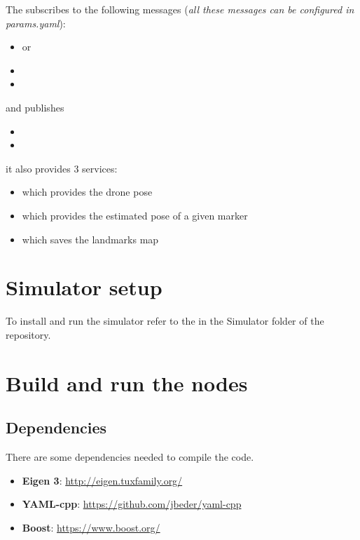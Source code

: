 The  subscribes to the following messages (\emph{all these messages can be configured in params.yaml}):
\begin{itemize}
    \item{ or }
    \item{}
    \item{}
\end{itemize}
and publishes
\begin{itemize}
    \item{}
    \item{}
\end{itemize}
it also provides 3 services:
\begin{itemize}
    \item{ which provides the drone pose}
    \item{ which provides the estimated pose of a given marker}
    \item{ which saves the landmarks map}
\end{itemize}

\section*{Simulator setup}
To install and run the simulator refer to the  in the Simulator folder of the repository.

\section*{Build and run the nodes}
\subsection*{Dependencies}
There are some dependencies needed to compile the code.
\begin{itemize}
    \item{\textbf{Eigen 3}: \url{http://eigen.tuxfamily.org/}}
    \item{\textbf{YAML-cpp}: \url{https://github.com/jbeder/yaml-cpp}}
    \item{\textbf{Boost}: \url{https://www.boost.org/}}
\end{itemize}

